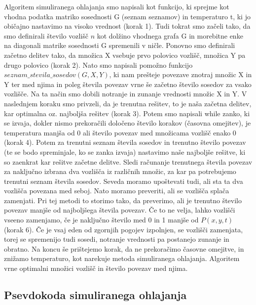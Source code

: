 \documentclass[12pt,a4paper]{amsart}
\theoremstyle{definition} %
\theoremstyle{plain} %
\begin{document}
Algoritem simuliranega ohlajanja smo napisali kot funkcijo, ki sprejme kot vhodna podatka matriko sosednosti G (seznam seznamov) in temperaturo t, ki jo običajno nastavimo na visoko vrednost (korak 1). Tudi tokrat smo začeli tako, da smo definirali število vozlišč $n$ kot dolžino vhodnega grafa G in morebitne enke na diagonali matrike sosednosti G spremenili v ničle. Ponovno smo definirali začetno delitev tako, da množica X vsebuje prvo polovico vozlišč, množica Y pa drugo polovico (korak 2). Nato smo napisali pomožno funkcijo $seznam\_stevila\_sosedov(G,X,Y)$, ki nam prešteje povezave znotraj množic X in Y ter med njima in poleg števila povezav vrne še začetno število sosedov za vsako vozlišče. Na ta način smo dobili notranje in zunanje vrednosti množic X in Y. V naslednjem koraku smo privzeli, da je trenutna rešitev, to je naša začetna delitev, kar optimalna oz. najboljša rešitev (korak 3). Potem  smo napisali while zanko, ki se izvaja, dokler nismo prekoračili določeno število  korakov (časovna omejitev), je temperatura manjša od 0 ali število povezav med množicama vozlišč enako 0 (korak 4). Potem za trenutni seznam števila sosedov in trenutno število povezav (te se bodo spreminjale, ko se zanka izvaja) nastavimo naše najboljše rešitve, ki so zaenkrat kar rešitve začetne delitve. Sledi računanje trenutnega števila povezav za naključno izbrana dva vozlišča iz različnih množic, za kar pa potrebujemo trenutni seznam števila sosedov. Seveda moramo upoštevati tudi, ali sta ta dva vozlišča povezana med seboj. Nato moramo preveriti, ali se vozlišča splača zamenjati. Pri tej metodi to storimo tako, da preverimo, ali je trenutno število povezav manjše od najboljšega števila povezav. Če to ne velja, lahko vozlišči vseeno zamenjamo, če je naključno število med 0 in 1 manjše od $P(x,y,t)$ (korak 6). Če je vsaj eden od zgornjih pogojev izpolnjen, se vozlišči zamenjata, torej se spremenijo tudi sosedi, notranje vrednosti pa postanejo zunanje in obratno. Na koncu še prištejemo korak, da ne prekoračimo časovne omejitve, in znižamo temperaturo, kot narekuje metoda simuliranega ohlajanja. Algoritem vrne optimalni množici vozlišč in število povezav med njima.\\


\subsection{Psevdokoda simuliranega ohlajanja}
\end{document}
